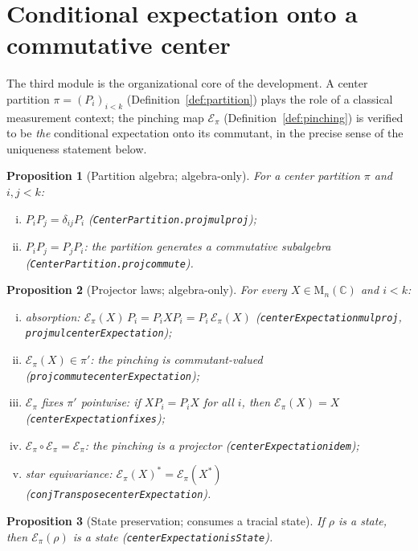 \documentclass[11pt]{article}
\renewcommand{\_}{\textunderscore\allowbreak}
\newtheorem{proposition}{Proposition}
\theoremstyle{remark}
\newcommand{\C}{\mathbb C}
\newcommand{\Mn}{\mathrm{M}_n(\C)}
\newcommand{\pinch}{\mathcal E}
\begin{document}
\section{Conditional expectation onto a commutative center}
\label{sec:center}

The third module is the organizational core of the development. A center partition $\pi = (P_i)_{i<k}$ (Definition~\ref{def:partition}) plays the role of a classical measurement context; the pinching map $\pinch_\pi$ (Definition~\ref{def:pinching}) is verified to be \emph{the} conditional expectation onto its commutant, in the precise sense of the uniqueness statement below.

\begin{proposition}[Partition algebra; algebra-only]
\label{prop:partition-alg}
For a center partition $\pi$ and $i, j < k$:
\begin{enumerate}[(i)]
\item $P_i P_j = \delta_{ij} P_i$ (\texttt{CenterPartition.proj\_mul\_proj});
\item $P_i P_j = P_j P_i$: the partition generates a commutative subalgebra (\texttt{CenterPartition.proj\_commute}).
\end{enumerate}
\end{proposition}

\begin{proposition}[Projector laws; algebra-only]
\label{prop:projector}
For every $X \in \Mn$ and $i < k$:
\begin{enumerate}[(i)]
\item absorption: $\pinch_\pi(X)\, P_i = P_i X P_i = P_i\, \pinch_\pi(X)$ (\texttt{centerExpectation\_mul\_proj}, \texttt{proj\_mul\_centerExpectation});
\item $\pinch_\pi(X) \in \pi'$: the pinching is commutant-valued (\texttt{proj\_commute\_centerExpectation});
\item $\pinch_\pi$ fixes $\pi'$ pointwise: if $X P_i = P_i X$ for all $i$, then $\pinch_\pi(X) = X$ (\texttt{centerExpectation\_fixes});
\item $\pinch_\pi \circ \pinch_\pi = \pinch_\pi$: the pinching is a projector (\texttt{centerExpectation\_idem});
\item star equivariance: $\pinch_\pi(X)^{*} = \pinch_\pi(X^{*})$ (\texttt{conjTranspose\_centerExpectation}).
\end{enumerate}
\end{proposition}

\begin{proposition}[State preservation; consumes a tracial state]
\label{prop:pinch-state}
If $\rho$ is a state, then $\pinch_\pi(\rho)$ is a state (\texttt{centerExpectation\_isState}).
\end{proposition}
\end{document}
